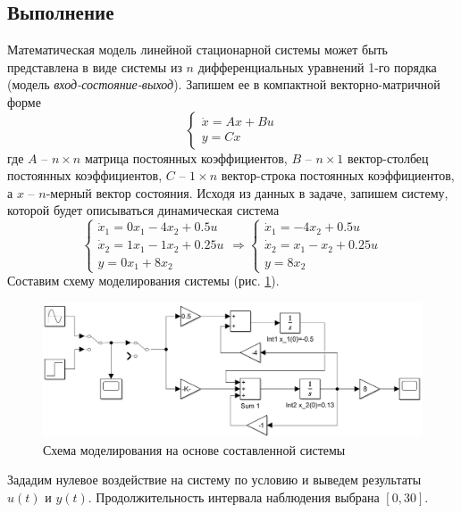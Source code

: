 \documentclass[a4paper, 12pt]{article}
\begin{document}
    \subsection{Выполнение}
    Математическая модель линейной стационарной системы может быть представлена в виде системы
    из $n$ дифференциальных уравнений 1-го порядка (модель \textit{вход-состояние-выход}).
    Запишем ее в компактной векторно-матричной форме
    $$
    \begin{cases}
        \dot{x}=Ax+Bu\\
        y=Cx
    \end{cases}
    $$
    где $A$ -- $n\times n$ матрица постоянных коэффициентов, $B$ -- $n\times1$ вектор-столбец постоянных
    коэффициентов, $C$ -- $1\times n$ вектор-строка постоянных коэффициентов, а $x$ -- $n$-мерный вектор состояния.
    Исходя из данных в задаче, запишем систему, которой будет описываться динамическая система
    $$
    \begin{cases}
    \dot{x}_1=0x_1-4x_2+0.5u\\
    \dot{x}_2=1x_1-1x_2+0.25u\\
    y=0x_1+8x_2
    \end{cases}
    \Rightarrow
    \begin{cases}
        \dot{x}_1=-4x_2+0.5u\\
        \dot{x}_2=x_1-x_2+0.25u\\
        y=8x_2
    \end{cases}
    $$
    Составим схему моделирования системы (рис. \ref{fig:scheme2}).
    \begin{figure}[H]
        \centering
        \includegraphics[scale=0.435]{scheme2.png}
        \captionsetup{skip=0pt}
        \caption{Схема моделирования на основе составленной системы}
        \label{fig:scheme2}
    \end{figure}
    Зададим нулевое воздействие на систему по условию и выведем результаты $u(t)$ и $y(t)$.
    Продолжительность интервала наблюдения выбрана $[0,30]$.
\end{document}
